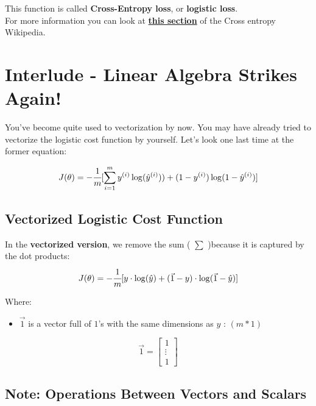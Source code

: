 \documentclass[]{article}
\providecommand{\tightlist}{%
  \setlength{\itemsep}{0pt}\setlength{\parskip}{0pt}}
\begin{document}
This function is called \textbf{Cross-Entropy loss}, or \textbf{logistic
loss}.\\
For more information you can look at
\href{https://en.wikipedia.org/wiki/Cross_entropy\#Cross-entropy_error_function_and_logistic_regression}{\textbf{this
section}} of the Cross entropy Wikipedia.

\clearpage

\hypertarget{interlude---linear-algebra-strikes-again-1}{%
\section{Interlude - Linear Algebra Strikes
Again!}\label{interlude---linear-algebra-strikes-again-1}}

You've become quite used to vectorization by now. You may have already
tried to vectorize the logistic cost function by yourself. Let's look
one last time at the former equation:

\large

\[
J( \theta) = -\cfrac{1} {m} \lbrack \sum_{i = 1}^{m} y^{(i)}\log(\hat{y}^{(i)})) + (1 - y^{(i)})\log(1 - \hat{y}^{(i)})\rbrack
\] \normalsize

\hypertarget{vectorized-logistic-cost-function}{%
\subsection{Vectorized Logistic Cost
Function}\label{vectorized-logistic-cost-function}}

In the \textbf{vectorized version}, we remove the sum ( \(\sum\)
)because it is captured by the dot products: \large \[
J( \theta) = -\cfrac{1} {m} \lbrack y \cdot \log(\hat{y}) + (\vec{1} - y) \cdot \log(\vec{1} - \hat{y})\rbrack
\] \normalsize

Where:

\begin{itemize}
\tightlist
\item
  \(\vec{1}\) is a vector full of \(1\)'s with the same dimensions as
  \(y\) : \((m * 1)\)
\end{itemize}

\large

\[
\vec{1} = \begin{bmatrix}
    1 \\
    \vdots \\
    1
\end{bmatrix}
\] \normalsize

\hypertarget{note-operations-between-vectors-and-scalars}{%
\subsection{Note: Operations Between Vectors and
Scalars}\label{note-operations-between-vectors-and-scalars}}
\end{document}
